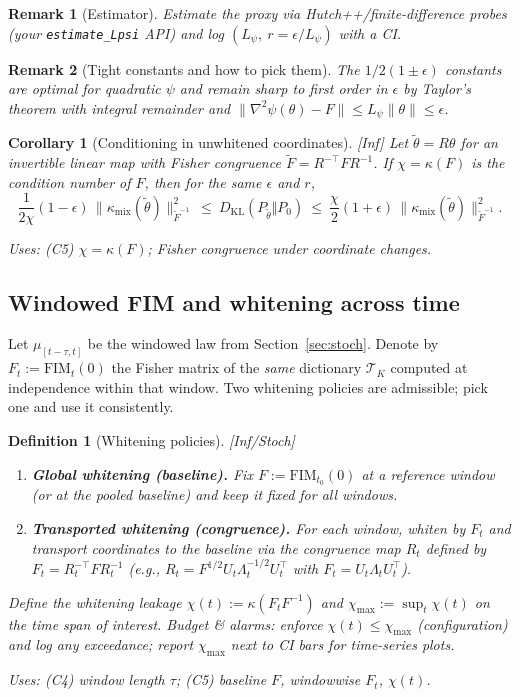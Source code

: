 \documentclass[10pt]{article}
\newcommand{\FIM}{\mathrm{FIM}}
\newcommand{\uses}[1]{\par\smallskip\noindent\textit{Uses: }#1\par\smallskip}
\newtheorem{definition}{Definition}
\newtheorem{remark}{Remark}
\newtheorem{corollary}{Corollary}
\begin{document}
\begin{remark}[Estimator]\label{rem:Lpsi-est}
Estimate the proxy via Hutch++/finite-difference probes (your \texttt{estimate\_Lpsi} API) and log $(L_\psi,\ r=\epsilon/L_\psi)$ with a CI. 
\end{remark}

\begin{remark}[Tight constants and how to pick them]\label{rem:constants}
The $1/2(1\pm\epsilon)$ constants are optimal for quadratic $\psi$ and remain sharp to first order in $\epsilon$ by Taylor’s theorem with integral remainder and $\|\nabla^2\psi(\theta)-F\|\le L_\psi\|\theta\|\le\epsilon$.
\end{remark}

\begin{corollary}[Conditioning in unwhitened coordinates]\label{cor:FIM-conditioning}
\emph{[\textup{Inf}]} Let $\tilde \theta=R\theta$ for an invertible linear map with Fisher congruence $\tilde F=R^{-\top} F R^{-1}$. If $\chi=\kappa(F)$ is the condition number of $F$, then for the same $\epsilon$ and $r$,
\[
\frac1{2\chi}(1-\epsilon)\,\|\kappa_{\mathrm{mix}}(\tilde\theta)\|_{\tilde F^{-1}}^{2}
\ \le\ D_{\mathrm{KL}}(P_{\tilde\theta}\Vert P_0)\
\le\ \frac{\chi}{2}(1+\epsilon)\,\|\kappa_{\mathrm{mix}}(\tilde\theta)\|_{\tilde F^{-1}}^{2}.
\]
\uses{(C5) $\chi=\kappa(F)$; Fisher congruence under coordinate changes.}
\end{corollary}

\subsection{Windowed FIM and whitening across time}\label{subsec:window-fim}

Let $\mu_{[t-\tau,t]}$ be the windowed law from Section~\ref{sec:stoch}. Denote by $F_t:=\FIM_t(0)$ the Fisher matrix of the \emph{same} dictionary $\mathcal T_K$ computed at independence within that window. Two whitening policies are admissible; pick one and use it consistently.

\begin{definition}[Whitening policies]\label{def:whitening-policies}
\emph{[\textup{Inf/Stoch}]}
\begin{enumerate}[leftmargin=*]
\item \textbf{Global whitening (baseline).} Fix $F:=\FIM_{t_0}(0)$ at a reference window (or at the pooled baseline) and keep it fixed for all windows.
\item \textbf{Transported whitening (congruence).} For each window, whiten by $F_t$ and transport coordinates to the baseline via the congruence map $R_t$ defined by $F_t=R_t^{-\top} F R_t^{-1}$ (e.g., $R_t=F^{1/2}U_t\Lambda_t^{-1/2}U_t^\top$ with $F_t=U_t\Lambda_t U_t^\top$).
\end{enumerate}
Define the \emph{whitening leakage} $\chi(t):=\kappa(F_t F^{-1})$ and $\chi_{\max}:=\sup_t \chi(t)$ on the time span of interest.
\emph{Budget \& alarms:} enforce $\chi(t)\le \chi_{\max}$ (configuration) and log any exceedance; report $\chi_{\max}$ next to CI bars for time-series plots.

\uses{(C4) window length $\tau$; (C5) baseline $F$, windowwise $F_t$, $\chi(t)$.}
\end{definition}
\end{document}
